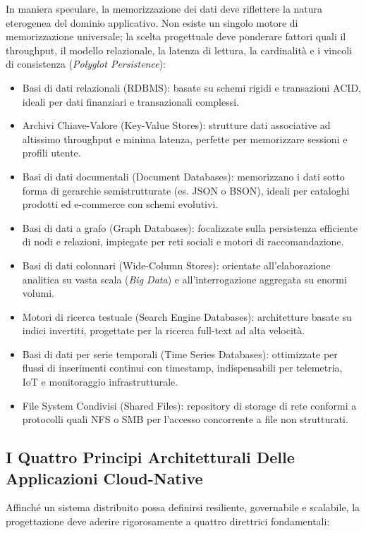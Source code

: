 \documentclass[11pt, a4paper]{article}
\begin{document}
In maniera speculare, la memorizzazione dei dati deve riflettere la natura eterogenea del dominio applicativo. Non esiste un singolo motore di memorizzazione universale; la scelta progettuale deve ponderare fattori quali il throughput, il modello relazionale, la latenza di lettura, la cardinalità e i vincoli di consistenza (\emph{Polyglot Persistence}):
\begin{itemize}[noitemsep]
    \item Basi di dati relazionali (RDBMS): basate su schemi rigidi e transazioni ACID, ideali per dati finanziari e transazionali complessi.
    \item Archivi Chiave-Valore (Key-Value Stores): strutture dati associative ad altissimo throughput e minima latenza, perfette per memorizzare sessioni e profili utente.
    \item Basi di dati documentali (Document Databases): memorizzano i dati sotto forma di gerarchie semistrutturate (es. JSON o BSON), ideali per cataloghi prodotti ed e-commerce con schemi evolutivi.
    \item Basi di dati a grafo (Graph Databases): focalizzate sulla persistenza efficiente di nodi e relazioni, impiegate per reti sociali e motori di raccomandazione.
    \item Basi di dati colonnari (Wide-Column Stores): orientate all'elaborazione analitica su vasta scala (\emph{Big Data}) e all'interrogazione aggregata su enormi volumi.
    \item Motori di ricerca testuale (Search Engine Databases): architetture basate su indici invertiti, progettate per la ricerca full-text ad alta velocità.
    \item Basi di dati per serie temporali (Time Series Databases): ottimizzate per flussi di inserimenti continui con timestamp, indispensabili per telemetria, IoT e monitoraggio infrastrutturale.
    \item File System Condivisi (Shared Files): repository di storage di rete conformi a protocolli quali NFS o SMB per l'accesso concorrente a file non strutturati.
\end{itemize}

\subsection{I Quattro Principi Architetturali Delle Applicazioni Cloud-Native}

Affinché un sistema distribuito possa definirsi resiliente, governabile e scalabile, la progettazione deve aderire rigorosamente a quattro direttrici fondamentali:
\end{document}
